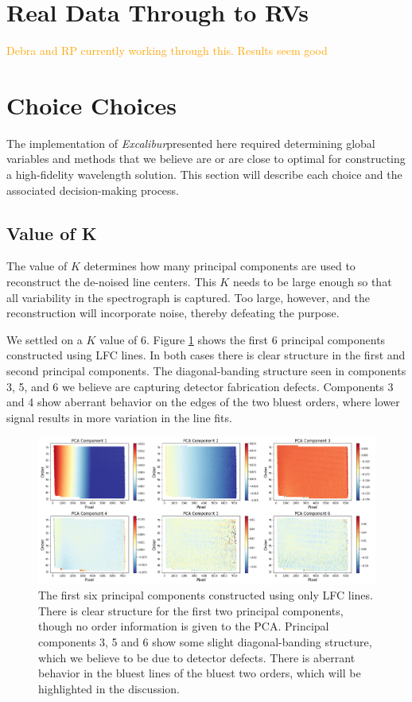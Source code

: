 \documentclass[twocolumn]{aastex63}
\newcommand{\lz}[1]{\textcolor{orange}{#1}}
\newcommand{\project}[1]{\textsl{#1}}
\newcommand{\name}{\project{Excalibur}}
\begin{document}
\section{Real Data Through to RVs} \label{sec:realdata}
\lz{Debra and RP currently working through this.  Results seem good}

\section{Choice Choices} \label{sec:choices}
The implementation of  \name presented here required determining global variables and methods that we believe are or are close to optimal for constructing a high-fidelity wavelength solution.  This section will describe each choice and the associated decision-making process.

\subsection{Value of K}
The value of $K$ determines how many principal components are used to reconstruct the de-noised line centers.  This $K$ needs to be large enough so that all variability in the spectrograph is captured.  Too large, however, and the reconstruction will incorporate noise, thereby defeating the purpose.

We settled on a $K$ value of 6.  Figure \ref{fig:pcLfc} shows the first 6 principal components constructed using LFC lines.  In both cases there is clear structure in the first and second principal components.  The diagonal-banding structure seen in components 3, 5, and 6 we believe are capturing detector fabrication defects.  Components 3 and 4 show aberrant behavior on the edges of the two bluest orders, where lower signal results in more variation in the line fits.

\begin{figure}[t]
\centering
\includegraphics[width=\textwidth]{Figures/pcsLfc6.png}
\caption{The first six principal components constructed using only LFC lines.  There is clear structure for the first two principal components, though no order information is given to the PCA.  Principal components 3, 5 and 6 show some slight diagonal-banding structure, which we believe to be due to detector defects.  There is aberrant behavior in the bluest lines of the bluest two orders, which will be highlighted in the discussion.}
\label{fig:pcLfc}
\end{figure}
\end{document}
